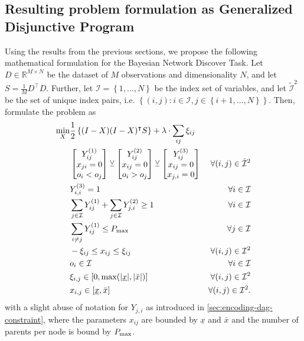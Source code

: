 \documentclass[11pt]{article}
\begin{document}
\subsection{Resulting problem formulation as Generalized Disjunctive Program}
\label{sec:orgd428e71}
Using the results from the previous sections, we propose the following mathematical formulation for the Bayesian Network Discover Task.
Let \(D \in \mathbb{R}^{M \times N}\) be the dataset of \(M\) observations and dimensionality \(N\), and let \(S = \frac{1}{M}D^\intercal D\).
Further, let \(\mathcal{I} = \left\{ 1, \dots, N \right\}\) be the index set of variables, and let \(\tilde{\mathcal{I}}^2\) be the set of unique index pairs, i.e. \(\left\{ (i, j) : i \in \mathcal{I}, j \in \left\{ i+1, \dots, N \right\} \right\}\).
Then, formulate the problem as
\begin{equation}
\label{eq:whole-formulation}
\begin{aligned}
\min_{X} &\frac{1}{2} \left\{ (I-X) (I-X)^\intercal S \right\} + \lambda \cdot \sum_{ij} \xi_{ij} & \\
& \begin{bmatrix} Y_{ij}^{(1)} \\ x_{ji} = 0 \\ o_i < o_j \end{bmatrix} \veebar
  \begin{bmatrix} Y_{ij}^{(2)} \\ x_{ij} = 0 \\ o_i > o_j \end{bmatrix} \veebar
  \begin{bmatrix} Y_{ij}^{(3)} \\ x_{ij} = 0 \\ x_{j, i} = 0  \end{bmatrix} & \forall (i, j) \in \tilde{\mathcal{I}}^2 \\
&Y_{i, i}^{(3)} = 1 & \forall i \in \mathcal{I}\\
&\sum_{j\in \mathcal{I}} Y_{ij}^{(1)} + \sum_{j \in \mathcal{I}} Y_{j,i}^{(2)} \geq 1 & \forall i \in \mathcal{I}\\
&\sum_{i \neq j} Y^{(1)}_{ij} \leq P_{\rm max} & \forall j \in \mathcal{I}\\
& -\xi_{ij} \leq x_{ij} \leq \xi_{ij} & \forall (i,j) \in \mathcal{I}^2\\
& o_i \in \mathcal{I}  & \forall i \in \mathcal{I}\\
& \xi_{i, j} \in [0, \max(|\underline{x}|,|\bar{x}|)] & \forall (i,j) \in \mathcal{I}^2\\
& x_{i, j} \in [\underline{x}, \bar{x}] & \forall (i,j) \in \mathcal{I}^2.
\end{aligned}
\end{equation}
with a slight abuse of notation for \(Y_{j,i}\) as introduced in \cref{sec:encoding-dag-constraint}, where the parameters \(x_{ij}\) are bounded by \(\underline{x}\) and \(\bar{x}\) and the number of parents per node is bound by \(P_{\rm max}\).
\end{document}
